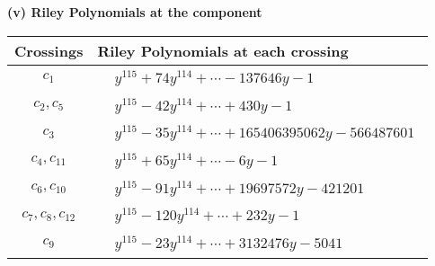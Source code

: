 \documentclass[1p]{elsarticle_modified}
\theoremstyle{definition}
\begin{document}
\flushleft \textbf{(v) Riley Polynomials at the component}\newline \\
\begin{tabular}{m{50pt}|m{274pt}}
Crossings & \hspace{64pt}Riley Polynomials at each crossing \\
\hline $$\begin{aligned}c_{1}\end{aligned}$$&$\begin{aligned}
&y^{115}+74 y^{114}+\cdots-137646 y-1
\end{aligned}$\\
\hline $$\begin{aligned}c_{2},c_{5}\end{aligned}$$&$\begin{aligned}
&y^{115}-42 y^{114}+\cdots+430 y-1
\end{aligned}$\\
\hline $$\begin{aligned}c_{3}\end{aligned}$$&$\begin{aligned}
&y^{115}-35 y^{114}+\cdots+165406395062 y-566487601
\end{aligned}$\\
\hline $$\begin{aligned}c_{4},c_{11}\end{aligned}$$&$\begin{aligned}
&y^{115}+65 y^{114}+\cdots-6 y-1
\end{aligned}$\\
\hline $$\begin{aligned}c_{6},c_{10}\end{aligned}$$&$\begin{aligned}
&y^{115}-91 y^{114}+\cdots+19697572 y-421201
\end{aligned}$\\
\hline $$\begin{aligned}c_{7},c_{8},c_{12}\end{aligned}$$&$\begin{aligned}
&y^{115}-120 y^{114}+\cdots+232 y-1
\end{aligned}$\\
\hline $$\begin{aligned}c_{9}\end{aligned}$$&$\begin{aligned}
&y^{115}-23 y^{114}+\cdots+3132476 y-5041
\end{aligned}$\\
\hline
\end{tabular}\\~\\
\end{document}
